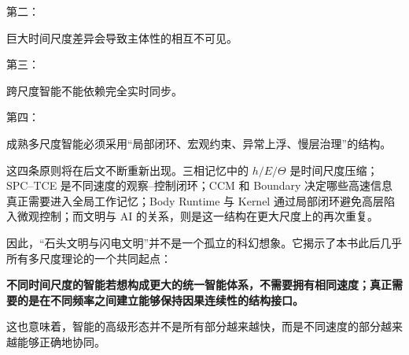 第二：

\begin{statementbox}
巨大时间尺度差异会导致主体性的相互不可见。
\end{statementbox}

第三：

\begin{statementbox}
跨尺度智能不能依赖完全实时同步。
\end{statementbox}

第四：

\begin{statementbox}
成熟多尺度智能必须采用“局部闭环、宏观约束、异常上浮、慢层治理”的结构。
\end{statementbox}

这四条原则将在后文不断重新出现。三相记忆中的 $h/E/\Theta$ 是时间尺度压缩；SPC--TCE 是不同速度的观察--控制闭环；CCM 和 Boundary 决定哪些高速信息真正需要进入全局工作记忆；Body Runtime 与 Kernel 通过局部闭环避免高层陷入微观控制；而文明与 AI 的关系，则是这一结构在更大尺度上的再次重复。

因此，“石头文明与闪电文明”并不是一个孤立的科幻想象。它揭示了本书此后几乎所有多尺度理论的一个共同起点：

\begin{statementbox}
\bfseries
不同时间尺度的智能若想构成更大的统一智能体系，不需要拥有相同速度；真正需要的是在不同频率之间建立能够保持因果连续性的结构接口。
\end{statementbox}

这也意味着，智能的高级形态并不是所有部分越来越快，而是不同速度的部分越来越能够正确地协同。
